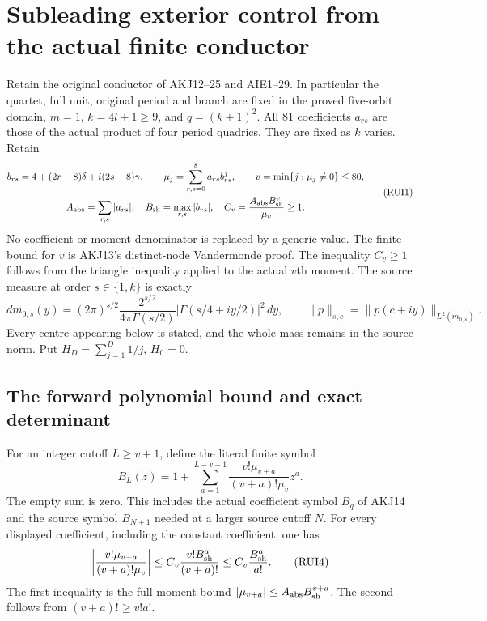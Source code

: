 \documentclass[11pt,a4paper]{article}
\begin{document}
\section{Subleading exterior control from the actual finite conductor}
\label{sec:RUI}
Retain the original conductor of AKJ12--25 and AIE1--29. In particular
the quartet, full unit, original period and branch are fixed in the
proved five-orbit domain, $m=1$, $k=4l+1\ge9$, and $q=(k+1)^2$.
All $81$ coefficients $a_{rs}$ are those of the actual product of four
period quadrics. They are fixed as $k$ varies. Retain
\[
 \begin{gathered}
 b_{rs}=4+(2r-8)\delta+i(2s-8)\gamma,\qquad
 \mu_j=\sum_{r,s=0}^8a_{rs}b_{rs}^j,\qquad
 v=\min\{j:\mu_j\ne0\}\le80,\\
 A_{\rm abs}=\sum_{r,s}|a_{rs}|,\quad
 B_{\rm sh}=\max_{r,s}|b_{rs}|,\quad
 C_v=\frac{A_{\rm abs}B_{\rm sh}^v}{|\mu_v|}\ge1.
 \end{gathered}\tag{RUI1}
\]
No coefficient or moment denominator is replaced by a generic value.
The finite bound for $v$ is AKJ13's distinct-node Vandermonde proof.
The inequality $C_v\ge1$ follows from the triangle inequality applied
to the actual $v$th moment. The source measure at order $s\in\{1,k\}$
is exactly
\[
 dm_{0,s}(y)=(2\pi)^{s/2}
 \frac{2^{s/2}}{4\pi\Gamma(s/2)}
 |\Gamma(s/4+iy/2)|^2\,dy,\qquad
 \|p\|_{s,c}=\|p(c+iy)\|_{L^2(m_{0,s})}.
 \tag{RUI2}
\]
Every centre appearing below is stated, and the whole mass remains in
the source norm. Put $H_D=\sum_{j=1}^D1/j$, $H_0=0$.

\subsection{The forward polynomial bound and exact determinant}
For an integer cutoff $L\ge v+1$, define the literal finite symbol
\[
 B_L(z)=1+\sum_{a=1}^{L-v-1}
       \frac{v!\mu_{v+a}}{(v+a)!\mu_v}z^a.
 \tag{RUI3}
\]
The empty sum is zero. This includes the actual coefficient symbol
$B_q$ of AKJ14 and the source symbol $B_{N+1}$ needed at a larger
source cutoff $N$. For every displayed coefficient, including the
constant coefficient, one has
\[
 \left|\frac{v!\mu_{v+a}}{(v+a)!\mu_v}\right|
 \le C_v\frac{v!B_{\rm sh}^a}{(v+a)!}
 \le C_v\frac{B_{\rm sh}^a}{a!}.
 \tag{RUI4}
\]
The first inequality is the full moment bound
$|\mu_{v+a}|\le A_{\rm abs}B_{\rm sh}^{v+a}$.
The second follows from $(v+a)!\ge v!a!$.
\end{document}
